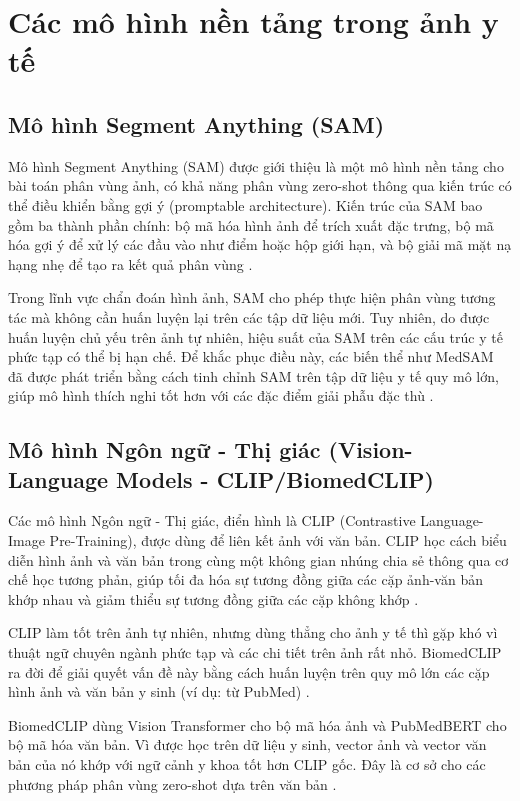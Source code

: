 \section{Các mô hình nền tảng trong ảnh y tế}

\subsection{Mô hình Segment Anything (SAM)}
Mô hình Segment Anything (SAM) được giới thiệu là một mô hình nền tảng cho bài toán phân vùng ảnh, có khả năng phân vùng zero-shot thông qua kiến trúc có thể điều khiển bằng gợi ý (promptable architecture). Kiến trúc của SAM bao gồm ba thành phần chính: bộ mã hóa hình ảnh để trích xuất đặc trưng, bộ mã hóa gợi ý để xử lý các đầu vào như điểm hoặc hộp giới hạn, và bộ giải mã mặt nạ hạng nhẹ để tạo ra kết quả phân vùng \cite{kirillov2023sam}.

Trong lĩnh vực chẩn đoán hình ảnh, SAM cho phép thực hiện phân vùng tương tác mà không cần huấn luyện lại trên các tập dữ liệu mới. Tuy nhiên, do được huấn luyện chủ yếu trên ảnh tự nhiên, hiệu suất của SAM trên các cấu trúc y tế phức tạp có thể bị hạn chế. Để khắc phục điều này, các biến thể như MedSAM đã được phát triển bằng cách tinh chỉnh SAM trên tập dữ liệu y tế quy mô lớn, giúp mô hình thích nghi tốt hơn với các đặc điểm giải phẫu đặc thù \cite{ma2024medsam}.

\subsection{Mô hình Ngôn ngữ - Thị giác (Vision-Language Models - CLIP/BiomedCLIP)}
Các mô hình Ngôn ngữ - Thị giác, điển hình là CLIP (Contrastive Language-Image Pre-Training), được dùng để liên kết ảnh với văn bản. CLIP học cách biểu diễn hình ảnh và văn bản trong cùng một không gian nhúng chia sẻ thông qua cơ chế học tương phản, giúp tối đa hóa sự tương đồng giữa các cặp ảnh-văn bản khớp nhau và giảm thiểu sự tương đồng giữa các cặp không khớp \cite{radford2021clip}.

CLIP làm tốt trên ảnh tự nhiên, nhưng dùng thẳng cho ảnh y tế thì gặp khó vì thuật ngữ chuyên ngành phức tạp và các chi tiết trên ảnh rất nhỏ. BiomedCLIP ra đời để giải quyết vấn đề này bằng cách huấn luyện trên quy mô lớn các cặp hình ảnh và văn bản y sinh (ví dụ: từ PubMed) \cite{zhang2024biomedclip}.

BiomedCLIP dùng Vision Transformer cho bộ mã hóa ảnh và PubMedBERT cho bộ mã hóa văn bản. Vì được học trên dữ liệu y sinh, vector ảnh và vector văn bản của nó khớp với ngữ cảnh y khoa tốt hơn CLIP gốc. Đây là cơ sở cho các phương pháp phân vùng zero-shot dựa trên văn bản \cite{zhang2024biomedclip}.

